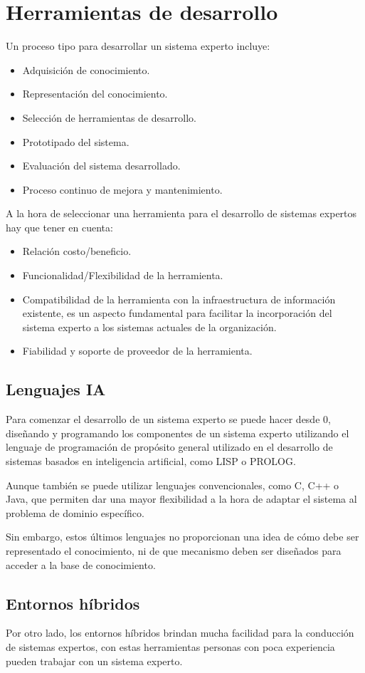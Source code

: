 \documentclass[12pt, twoside, openright]{report} %
\begin{document}
\section{Herramientas de desarrollo}
Un proceso tipo para desarrollar un sistema experto incluye:
\begin{itemize}
	\item Adquisición de conocimiento.
	\item Representación del conocimiento.
	\item Selección de herramientas de desarrollo.
	\item Prototipado del sistema.
	\item Evaluación del sistema desarrollado.
	\item Proceso continuo de mejora y mantenimiento.
\end{itemize}
A la hora de seleccionar una herramienta para el desarrollo de sistemas expertos hay que tener en cuenta:
\begin{itemize}
	\item Relación costo/beneficio.
	\item Funcionalidad/Flexibilidad de la herramienta.
	\item Compatibilidad de la herramienta con la infraestructura de información existente, es un aspecto fundamental para facilitar la incorporación del sistema experto a los sistemas actuales de la organización.
	\item Fiabilidad y soporte de proveedor de la herramienta.
\end{itemize}
\subsection{Lenguajes IA}
Para comenzar el desarrollo de un sistema experto se puede hacer desde 0, diseñando y programando los componentes de un sistema experto utilizando el lenguaje de programación de propósito general utilizado en el desarrollo de sistemas basados en inteligencia artificial, como LISP o PROLOG.

Aunque también se puede utilizar lenguajes convencionales, como C, C++ o Java, que permiten dar una mayor flexibilidad a la hora de adaptar el sistema al problema de dominio específico.

Sin embargo, estos últimos lenguajes no proporcionan una idea de cómo debe ser representado el conocimiento, ni de que mecanismo deben ser diseñados para acceder a la base de conocimiento.

\subsection{Entornos híbridos}
Por otro lado, los entornos híbridos brindan mucha facilidad para la conducción de sistemas expertos, con estas herramientas personas con poca experiencia pueden trabajar con un sistema experto.
\end{document}
